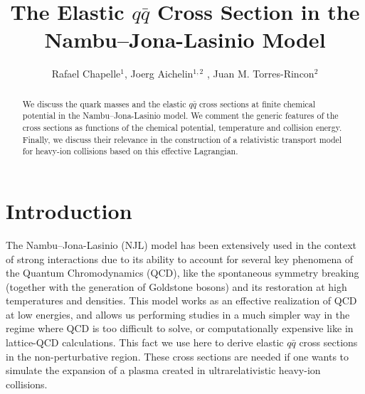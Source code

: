 \documentclass[a4paper]{jpconf}
\begin{document}
\title{The Elastic $q\bar q$ Cross Section in the Nambu--Jona-Lasinio Model}

\author
{Rafael Chapelle$^1$, Joerg Aichelin$^{1,2}$ , Juan M. Torres-Rincon$^2$}
\address{$^1$ Subatech, UMR 6457, IN2P3/CNRS, Universit\'e de Nantes, \'Ecole de Mines de Nantes, 4 rue Alfred Kastler 44307,
Nantes, France}
\address{$^2$ Frankfurt Institute for Advances Studies. Johann Wolfgang Goethe University, Ruth-Moufang-Str. 1,
60438, Frankfurt am Main, Germany}


\begin{abstract}
We discuss the quark masses and the elastic  $q\bar q$ cross sections at finite chemical potential in the Nambu--Jona-Lasinio model. 
We comment the generic features of the cross sections as functions of the chemical potential, temperature and collision energy. Finally, we discuss their 
relevance in the construction of a relativistic transport model for heavy-ion collisions based on this effective Lagrangian.
\end{abstract}

\section{Introduction}
 The Nambu--Jona-Lasinio (NJL) model
has been extensively used in the context of strong interactions due to its ability to account for several key
phenomena of the Quantum Chromodynamics (QCD), like the spontaneous symmetry breaking (together with the generation of
Goldstone bosons) and its restoration at high temperatures and densities. This model works as an effective realization of 
QCD at low energies, and allows us performing studies in a much simpler way in the regime where QCD is too difficult
to solve, or computationally expensive like in lattice-QCD calculations. This fact we use here to derive elastic $q\bar q$ cross sections in
the non-perturbative region. These cross sections are needed if one wants to simulate the expansion of a plasma created in ultrarelativistic
heavy-ion collisions.
\end{document}
